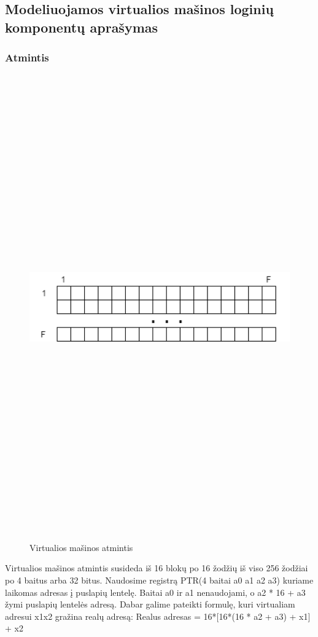 \documentclass[oneside]{VUMIFPSkursinis}
\begin{document}
 \subsection{Modeliuojamos virtualios mašinos loginių komponentų aprašymas}
	\subsubsection{Atmintis}
	\begin{figure}[H]
		\centering	
	\includegraphics[width=18cm,height=20cm,keepaspectratio]{VMAtmintis.png}
	\caption{Virtualios mašinos atmintis}
	\label{fig:Virtualios mašinos atmintis}
\end{figure}

	Virtualios mašinos atmintis susideda iš 16 blokų po 16 žodžių iš viso 256 žodžiai po 4 baitus arba 32 bitus. Naudosime registrą PTR(4 baitai a0 a1 a2 a3) kuriame laikomas adresas į puslapių lentelę. Baitai a0 ir a1 nenaudojami, o a2 * 16 + a3 žymi puslapių lentelės adresą. Dabar galime pateikti formulę, kuri virtualiam
adresui x1x2 gražina realų adresą:
Realus adresas = 16*[16*(16 * a2 + a3) + x1] + x2
\end{document}

